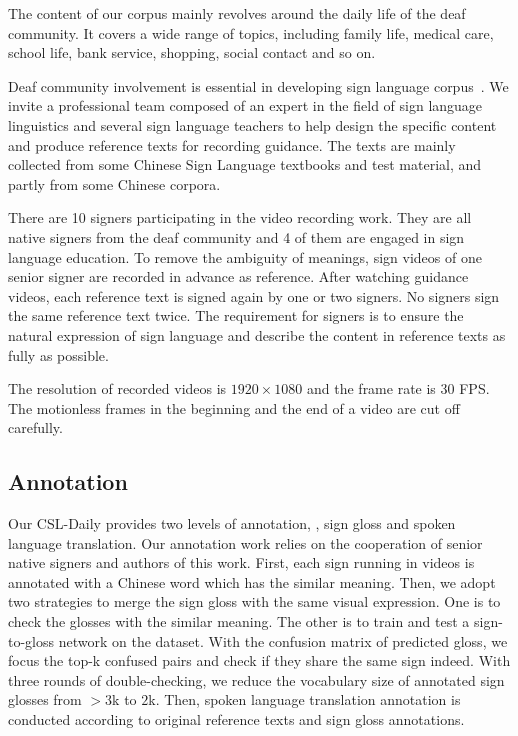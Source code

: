\documentclass[final]{cvpr}
\begin{document}
The content of our corpus mainly revolves around the daily life of the deaf community. 
It covers a wide range of topics, including family life, medical care, school life, bank service, shopping, social contact and so on. 
 
Deaf community involvement is essential in developing sign language corpus~\cite{bragg2019slp}.
We invite a professional team composed of an expert in the field of sign language linguistics and several sign language teachers to help design the specific content and produce reference texts for recording guidance. 
The texts are mainly collected from some Chinese Sign Language textbooks and test material, and partly from some Chinese corpora. 

There are 10 signers participating in the video recording work. 
They are all native signers from the deaf community and 4 of them are engaged in sign language education. 
To remove the ambiguity of meanings, sign videos of one senior signer are recorded in advance as reference. 
After watching guidance videos, each reference text is signed again by one or two signers. 
No signers sign the same reference text twice. 
The requirement for signers is to ensure the natural expression of sign language and describe the content in reference texts as fully as possible. 

The resolution of recorded videos is $1920\!\times\!1080$ and the frame rate is 30 FPS. 
The motionless frames in the beginning and the end of a video are cut off carefully. 

\subsection{Annotation}

Our CSL-Daily provides two levels of annotation, \ie, sign gloss and spoken language translation.
Our annotation work relies on the cooperation of senior native signers and authors of this work. 
First, each sign running in videos is annotated with a Chinese word which has the similar meaning. 
Then, we adopt two strategies to merge the sign gloss with the same visual expression. 
One is to check the glosses with the similar meaning. 
The other is to train and test a sign-to-gloss network on the dataset. 
With the confusion matrix of predicted gloss, we focus the top-k confused pairs and check if they share the same sign indeed. 
With three rounds of double-checking, we reduce the vocabulary size of annotated sign glosses from $>\!3$k to $2$k. 
Then, spoken language translation annotation is conducted according to original reference texts and sign gloss annotations.
\end{document}
